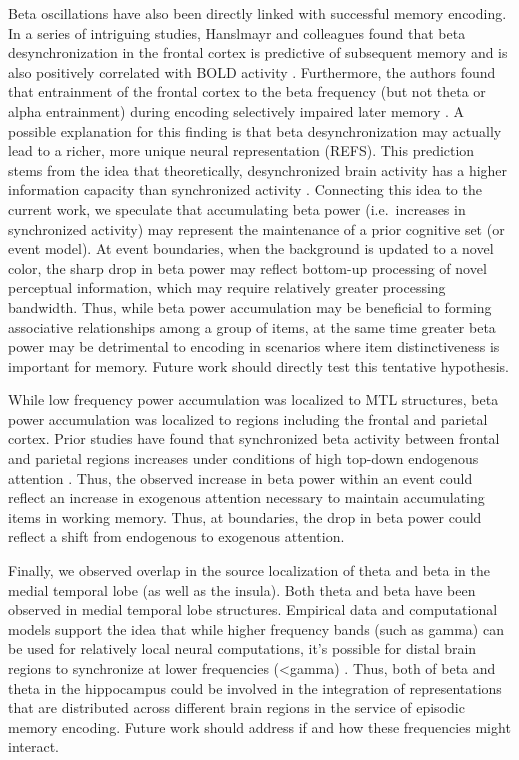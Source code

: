 Beta oscillations have also been directly linked with successful memory
encoding. In a series of intriguing studies, Hanslmayr and colleagues
found that beta desynchronization in the frontal cortex is predictive of
subsequent memory and is also positively correlated with BOLD activity
\autocite{hanslmayr_relationship_2011}. Furthermore, the authors found
that entrainment of the frontal cortex to the beta frequency (but not
theta or alpha entrainment) during encoding selectively impaired later
memory \autocite{hanslmayr_entrainment_2014}. A possible explanation for
this finding is that beta desynchronization may actually lead to a
richer, more unique neural representation (REFS). This prediction stems
from the idea that theoretically, desynchronized brain activity has a
higher information capacity than synchronized activity
\autocite{hanslmayr_oscillations_2016}. Connecting this idea to the
current work, we speculate that accumulating beta power (i.e.~increases
in synchronized activity) may represent the maintenance of a prior
cognitive set (or event model). At event boundaries, when the background
is updated to a novel color, the sharp drop in beta power may reflect
bottom-up processing of novel perceptual information, which may require
relatively greater processing bandwidth. Thus, while beta power
accumulation may be beneficial to forming associative relationships
among a group of items, at the same time greater beta power may be
detrimental to encoding in scenarios where item distinctiveness is
important for memory. Future work should directly test this tentative
hypothesis.

While low frequency power accumulation was localized to MTL structures,
beta power accumulation was localized to regions including the frontal
and parietal cortex. Prior studies have found that synchronized beta
activity between frontal and parietal regions increases under conditions
of high top-down endogenous attention \autocite{buschman_top-down_2007}.
Thus, the observed increase in beta power within an event could reflect
an increase in exogenous attention necessary to maintain accumulating
items in working memory. Thus, at boundaries, the drop in beta power
could reflect a shift from endogenous to exogenous attention.

Finally, we observed overlap in the source localization of theta and
beta in the medial temporal lobe (as well as the insula). Both theta and
beta have been observed in medial temporal lobe structures. Empirical
data and computational models support the idea that while higher
frequency bands (such as gamma) can be used for relatively local neural
computations, it's possible for distal brain regions to synchronize at
lower frequencies (\textless{}gamma) \autocite{kopell_gamma_2000}. Thus,
both of beta and theta in the hippocampus could be involved in the
integration of representations that are distributed across different
brain regions in the service of episodic memory encoding. Future work
should address if and how these frequencies might interact.
